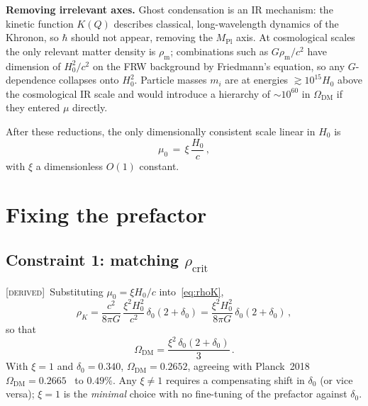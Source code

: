 \documentclass[prd,twocolumn,superscriptaddress,longbibliography,floatfix]{revtex4-2}
\newcommand{\Hzero}{H_{0}}
\newcommand{\muzero}{\mu_{0}}
\newcommand{\rhocrit}{\rho_{\mathrm{crit}}}
\newcommand{\OmegaDM}{\Omega_{\mathrm{DM}}}
\newcommand{\MPl}{M_{\mathrm{Pl}}}
\newcommand{\derived}{\textsc{[derived]}}
\begin{document}
\textbf{Removing irrelevant axes.}  Ghost condensation
is an IR mechanism: the kinetic function $K(Q)$ describes
classical, long-wavelength dynamics of the Khronon, so
$\hbar$ should not appear, removing the $\MPl$ axis.
At cosmological scales the only relevant matter
density is $\rho_{\mathrm{m}}$; combinations such as
$G\rho_{\mathrm{m}}/c^{2}$ have dimension of $\Hzero^{2}/c^{2}$
on the FRW background by Friedmann's equation, so any
$G$-dependence collapses onto $\Hzero^{2}$.  Particle
masses $m_{i}$ are at energies $\gtrsim 10^{15}\Hzero$
above the cosmological IR scale and would introduce a
hierarchy of $\sim 10^{60}$ in $\OmegaDM$ if they entered
$\mu$ directly.

After these reductions, the only dimensionally consistent
scale linear in $\Hzero$ is
\begin{equation}
\boxed{\;\muzero \,=\, \xi\,\frac{\Hzero}{c}\,,\;}
\label{eq:mu0}
\end{equation}
with $\xi$ a dimensionless $O(1)$ constant.

\section{Fixing the prefactor}
\label{sec:prefactor}

\subsection{Constraint 1: matching $\rhocrit$}

\derived\ Substituting $\muzero = \xi\Hzero/c$
into~\eqref{eq:rhoK},
\begin{equation}
\rho_{K} = \frac{c^{2}}{8\pi G}\,\frac{\xi^{2}\Hzero^{2}}{c^{2}}\,
\delta_{0}(2+\delta_{0})
= \frac{\xi^{2}\Hzero^{2}}{8\pi G}\,\delta_{0}(2+\delta_{0})\,,
\label{eq:rhoK_xi}
\end{equation}
so that
\begin{equation}
\OmegaDM = \frac{\xi^{2}\,\delta_{0}(2+\delta_{0})}{3}\,.
\label{eq:OmegaDM_xi}
\end{equation}
With $\xi = 1$ and $\delta_{0} = 0.340$,
$\OmegaDM = 0.2652$, agreeing with Planck~2018
$\OmegaDM = 0.2665$~\cite{Planck2018} to $0.49\%$.
Any $\xi \neq 1$ requires a compensating shift in
$\delta_{0}$ (or vice versa); $\xi = 1$ is the
\emph{minimal} choice with no fine-tuning of the
prefactor against $\delta_{0}$.
\end{document}
